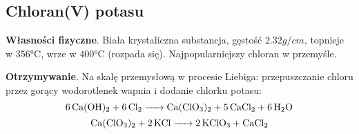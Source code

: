 \subsection{Chloran(V) potasu }
\textbf{Własności fizyczne}.
Biała krystaliczna substancja, gęstość $2.32 \si{g \per cm}$, topnieje w $356 \si{\celsius}$, wrze w $400 \si{\celsius}$ (rozpada się).
Najpopularniejszy chloran w przemyśle.

\textbf{Otrzymywanie}.
Na skalę przemysłową w procesie Liebiga: przepuszczanie chloru przez gorący wodorotlenek wapnia i dodanie chlorku potasu:
$$\ce{6 Ca(OH)2 + 6 Cl2 -> Ca(ClO3)2 + 5 CaCl2 + 6 H2O}$$ 
$$\ce{Ca(ClO3)2 + 2 KCl -> 2 KClO3 + CaCl2}$$

